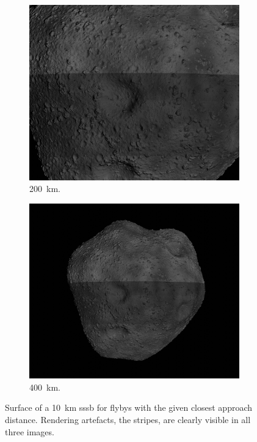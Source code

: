 \begin{figure}[htb]
\begin{subfigure}[b]{0.32\textwidth}
            \includegraphics[width=\textwidth]{doc/thesis/0_figures/rendering_artefacts/200_10_SssbOnly_2017-08-15T115845-190000.jpg}
            \caption{\SI{200}{\kilo\meter}.}
            \label{fig:render_artefacts_200}
        \end{subfigure}
        \begin{subfigure}[b]{0.32\textwidth}
            \centering
            \includegraphics[width=\textwidth]{doc/thesis/0_figures/rendering_artefacts/400_10_SssbOnly_2017-08-15T115845-190000.jpg}
            \caption{\SI{400}{\kilo\meter}.}
            \label{fig:render_artefacts_400}
        \end{subfigure}
    \caption{Surface of a \SI{10}{\kilo\meter} \gls{sssb} for flybys with the given closest approach distance. Rendering artefacts, the stripes, are clearly visible in all three images.}
    \label{fig:render_artefacts}
\end{figure}

